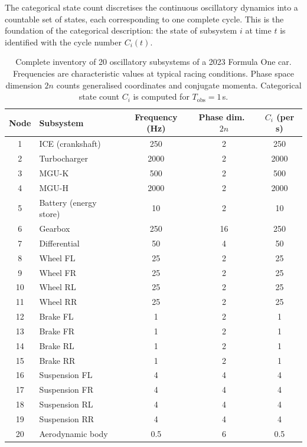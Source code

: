 \documentclass[twocolumn,10pt,a4paper]{article}
\theoremstyle{definition}
\theoremstyle{remark}
\begin{document}
The categorical state count discretises the continuous oscillatory dynamics into a countable set of states, each corresponding to one complete cycle. This is the foundation of the categorical description: the state of subsystem $i$ at time $t$ is identified with the cycle number $C_i(t)$.

\begin{table}[!htbp]
\centering
\caption{Complete inventory of 20 oscillatory subsystems of a 2023 Formula One car. Frequencies are characteristic values at typical racing conditions. Phase space dimension $2n$ counts generalised coordinates and conjugate momenta. Categorical state count $C_i$ is computed for $T_{\mathrm{obs}} = 1$\,s.}
\label{tab:inventory}
\begin{tabular}{@{}clccc@{}}
\toprule
Node & Subsystem & Frequency (Hz) & Phase dim.\ $2n$ & $C_i$ (per s) \\
\midrule
1  & ICE (crankshaft)     & 250   & 2  & 250 \\
2  & Turbocharger         & 2000  & 2  & 2000 \\
3  & MGU-K                & 500   & 2  & 500 \\
4  & MGU-H                & 2000  & 2  & 2000 \\
5  & Battery (energy store) & 10  & 2  & 10 \\
6  & Gearbox              & 250   & 16 & 250 \\
7  & Differential         & 50    & 4  & 50 \\
8  & Wheel FL             & 25    & 2  & 25 \\
9  & Wheel FR             & 25    & 2  & 25 \\
10 & Wheel RL             & 25    & 2  & 25 \\
11 & Wheel RR             & 25    & 2  & 25 \\
12 & Brake FL             & 1     & 2  & 1 \\
13 & Brake FR             & 1     & 2  & 1 \\
14 & Brake RL             & 1     & 2  & 1 \\
15 & Brake RR             & 1     & 2  & 1 \\
16 & Suspension FL        & 4     & 4  & 4 \\
17 & Suspension FR        & 4     & 4  & 4 \\
18 & Suspension RL        & 4     & 4  & 4 \\
19 & Suspension RR        & 4     & 4  & 4 \\
20 & Aerodynamic body     & 0.5   & 6  & 0.5 \\
\bottomrule
\end{tabular}
\end{table}
\end{document}
